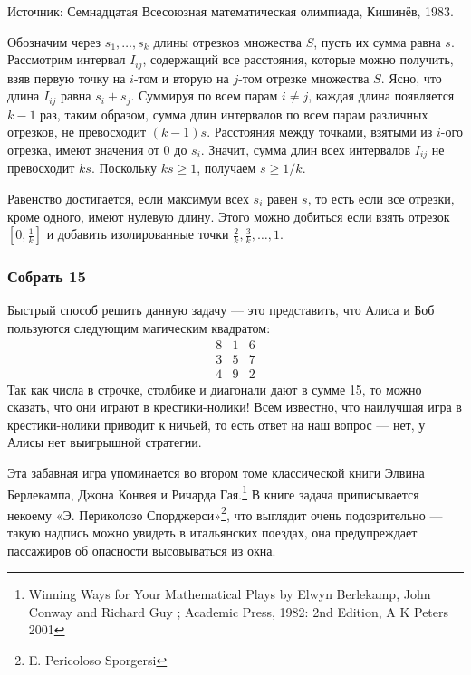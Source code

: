 {\small Источник: Семнадцатая Всесоюзная математическая олимпиада, Кишинёв, 1983.}

Обозначим через $s_1,\dots,s_k$ длины отрезков множества $S$,
пусть их сумма равна $s$.
Рассмотрим интервал $I_{ij}$, содержащий все расстояния, которые можно получить, взяв первую точку на $i$-том и вторую на $j$-том отрезке множества $S$.
Ясно, что длина $I_{ij}$ равна $s_i+s_j$.
Суммируя по всем парам $i\ne j$, 
каждая длина появляется $k-1$ раз,
таким образом, сумма длин интервалов по всем парам различных отрезков, не превосходит $(k-1) s$.
Расстояния между точками, взятыми из $i$-ого отрезка, имеют значения от $0$ до $s_i$.
Значит, сумма длин всех интервалов $I_{ij}$ не превосходит $k s$.
Поскольку $k s\ge 1$, получаем $s\ge 1/k$.
\heart

Равенство достигается, если максимум всех $s_i$ равен $s$, 
то есть если все отрезки, кроме одного, имеют нулевую длину.
Этого можно добиться если взять отрезок $[0,\tfrac1k]$ и добавить изолированные точки
$\tfrac2k,\tfrac3k,\dots,1$.


\subsubsection*{Собрать 15} %

Быстрый способ решить данную задачу --- это представить, что Алиса и Боб пользуются следующим магическим квадратом:
$$
\begin{matrix}
8&1&6\\
3&5&7\\
4&9&2
\end{matrix}
$$
Так как числа в строчке, столбике и диагонали дают в сумме 15, то можно сказать, что они играют в крестики-нолики! 
Всем известно, что наилучшая игра в крестики-нолики приводит к ничьей,
то есть ответ на наш вопрос --- нет, у Алисы нет выигрышной стратегии.
\heart

Эта забавная игра упоминается во втором томе классической книги Элвина Берлекампа, Джона Конвея и Ричарда Гая.\footnote{Winning Ways for Your Mathematical Plays by Elwyn Berlekamp, John Conway and Richard Guy ; Academic Press, 1982: 2nd Edition, A K Peters 2001}
В книге задача приписывается некоему «Э. Периколозо Спорджерси»\footnote{E. Pericoloso Sporgersi}, что выглядит очень подозрительно --- такую надпись можно увидеть в итальянских поездах, она предупреждает пассажиров об опасности высовываться из окна.
